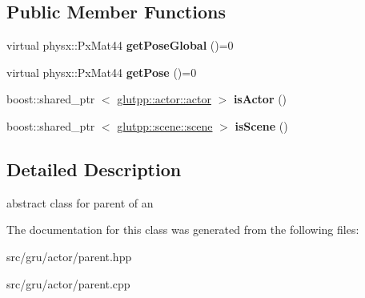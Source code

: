 \subsection*{\-Public \-Member \-Functions}
\begin{DoxyCompactItemize}
\item 
\hypertarget{classglutpp_1_1actor_1_1parent_a9fac5481a523174d39efae704850ba22}{virtual physx\-::\-Px\-Mat44 {\bfseries get\-Pose\-Global} ()=0}\label{classglutpp_1_1actor_1_1parent_a9fac5481a523174d39efae704850ba22}

\item 
\hypertarget{classglutpp_1_1actor_1_1parent_ac72a9f63348a6493f3437839c3f3b17b}{virtual physx\-::\-Px\-Mat44 {\bfseries get\-Pose} ()=0}\label{classglutpp_1_1actor_1_1parent_ac72a9f63348a6493f3437839c3f3b17b}

\item 
\hypertarget{classglutpp_1_1actor_1_1parent_a7cd25ee9d11a6652f0be2e9c7cc6a20b}{boost\-::shared\-\_\-ptr\*
$<$ \hyperlink{classglutpp_1_1actor_1_1actor}{glutpp\-::actor\-::actor} $>$ {\bfseries is\-Actor} ()}\label{classglutpp_1_1actor_1_1parent_a7cd25ee9d11a6652f0be2e9c7cc6a20b}

\item 
\hypertarget{classglutpp_1_1actor_1_1parent_a79d907398b663b55197babc36184dc33}{boost\-::shared\-\_\-ptr\*
$<$ \hyperlink{classglutpp_1_1scene_1_1scene}{glutpp\-::scene\-::scene} $>$ {\bfseries is\-Scene} ()}\label{classglutpp_1_1actor_1_1parent_a79d907398b663b55197babc36184dc33}

\end{DoxyCompactItemize}


\subsection{\-Detailed \-Description}
abstract class for parent of an  

\-The documentation for this class was generated from the following files\-:\begin{DoxyCompactItemize}
\item 
src/gru/actor/parent.\-hpp\item 
src/gru/actor/parent.\-cpp\end{DoxyCompactItemize}
